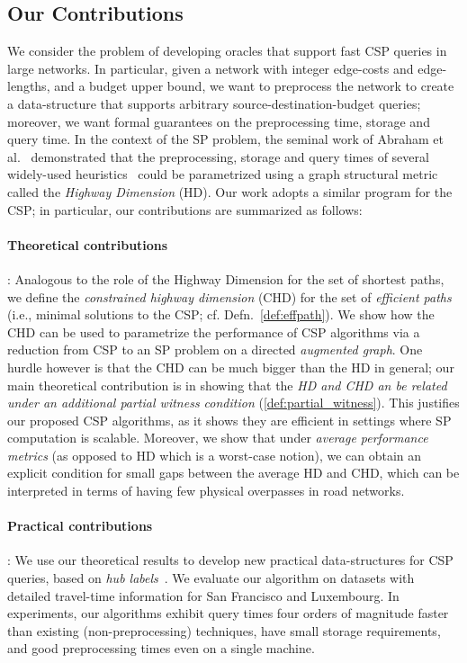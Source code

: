 \subsection{Our Contributions}
We consider the problem of developing oracles that support fast CSP queries in large networks. 
In particular, given a network with integer edge-costs and edge-lengths, and a budget upper bound, we want to preprocess the network to create a data-structure that supports arbitrary source-destination-budget queries; moreover, we want formal guarantees on the preprocessing time, storage and query time.
 In the context of the SP problem, the seminal work of Abraham et al.~\cite{highway2013, highway2010} demonstrated that the preprocessing, storage and query times of several widely-used heuristics~\cite{dimacs09} could be parametrized using a graph structural metric called the \emph{Highway Dimension} (HD).
Our work adopts a similar program for the CSP; in particular, our contributions are summarized as follows:

\paragraph{Theoretical contributions}: 
Analogous to the role of the Highway Dimension for the set of shortest paths, we define the \emph{constrained highway dimension} (CHD) for the set of {\em efficient paths} (i.e., minimal solutions to the CSP; cf. Defn.~\ref{def:effpath}). 
We show how the CHD can be used to parametrize the performance of CSP algorithms via a reduction from CSP to an SP problem on a directed \emph{augmented graph}.
One hurdle however is that the CHD can be much bigger than the HD in general; our main theoretical contribution is in showing that the \emph{HD and CHD an be related under an additional partial witness condition} (\cref{def:partial_witness}). 
This justifies our proposed CSP algorithms, as it shows they are efficient in settings where SP computation is scalable. Moreover, we show that under \emph{average performance metrics} (as opposed to HD which is a worst-case notion), we can obtain an explicit condition for small gaps between the average HD and CHD, which can be interpreted in terms of having few physical overpasses in road networks.

\paragraph{Practical contributions}: 
We use our theoretical results to develop new practical data-structures for CSP queries, based on {\em hub labels}~\cite{cohen_definition_hl}. 
We evaluate our algorithm on datasets with detailed travel-time information for San Francisco and Luxembourg.
In experiments, our algorithms exhibit query times four orders of magnitude faster than existing (non-preprocessing) techniques, have small storage requirements, and good preprocessing times even on a single machine. 
 


